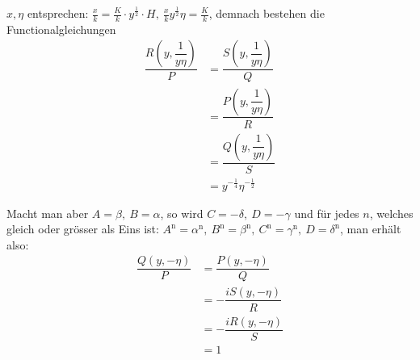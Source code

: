 $x,\allowbreak \eta$ entsprechen: $\frac{x}k=\frac Kk\cdot y^{\frac12}\cdot H,\allowbreak \ \frac{x}k y^{\frac12}\eta=\frac Kk$, demnach bestehen die Functionalgleichungen
\[
\begin{aligned}\dfrac{R(y,\dfrac1{y\eta})}P
&=\dfrac{S(y,\dfrac1{y\eta})}Q
\\[7pt]&=\dfrac{P(y,\dfrac1{y\eta})}R
\\[7pt]&=\dfrac{Q(y,\dfrac1{y\eta})}S
\\[7pt]&=y^{-\frac14}\eta^{-\frac12}\end{aligned}
\]

Macht man aber $A=\beta,\allowbreak \ B=\alpha$, so wird $C=-\delta,\allowbreak \ D=-\gamma$ und für jedes $n$, welches gleich oder grösser als Eins ist: $A^{\mathrm n}=\alpha^{\mathrm n},\allowbreak \ B^{\mathrm n}=\beta^{\mathrm n},\allowbreak \ C^{\mathrm n}=\gamma^{\mathrm n},\allowbreak \ D=\delta^{\mathrm n}$, man erhält also:
\[
\begin{aligned}\dfrac{Q(y,-\eta)}P
&=\dfrac{P(y,-\eta)}Q
\\[7pt]&=-\dfrac{iS(y,-\eta)}R
\\[7pt]&=-\dfrac{iR(y,-\eta)}S\\[7pt]&=1\end{aligned}
\]

